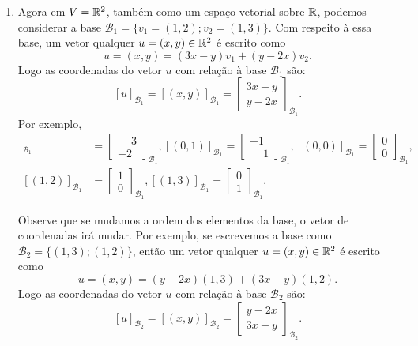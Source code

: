 \begin{exemplos}
\begin{enumerate}
    \item Agora em $V = \mathbb{R}^2$, também como um espaço vetorial sobre $\mathbb{R}$, podemos considerar a base $\mathcal{B}_1 = \{v_1 = (1, 2); v_2 = (1, 3)\}$. Com respeito à essa base, um vetor qualquer $u = (x, y) \in \mathbb{R}^2$ é escrito como
      \[
            u = (x, y) = (3x - y)v_1 + (y - 2x)v_2.
      \]
      Logo as coordenadas do vetor $u$ com relação à base $\mathcal{B}_1$ são:
      \[
        [u]_{\mathcal{B}_1} = [(x, y)]_{\mathcal{B}_1} = \begin{bmatrix}3x - y\\y - 2x\end{bmatrix}_{\mathcal{B}_1}.
      \]
      Por exemplo,
      \begin{align*}
        [(1, 0)]_{\mathcal{B}_1} &= \begin{bmatrix}\phantom{-}3\\-2\end{bmatrix}_{\mathcal{B}_1},
        [(0, 1)]_{\mathcal{B}_1} = \begin{bmatrix}-1\\\phantom{-}1\end{bmatrix}_{\mathcal{B}_1},
        [(0, 0)]_{\mathcal{B}_1} = \begin{bmatrix}0\\0\end{bmatrix}_{\mathcal{B}_1},\\
        [(1, 2)]_{\mathcal{B}_1} &= \begin{bmatrix}1\\0\end{bmatrix}_{\mathcal{B}_1},
        [(1, 3)]_{\mathcal{B}_1} = \begin{bmatrix}0\\1\end{bmatrix}_{\mathcal{B}_1}.
      \end{align*}

      Observe que se mudamos a ordem dos elementos da base, o vetor de coordenadas irá mudar. Por exemplo, se escrevemos a base como $\mathcal{B}_2 = \{(1, 3); (1, 2)\}$, então um vetor qualquer $u = (x, y) \in \mathbb{R}^2$ é escrito como
      \[
            u = (x, y) = (y - 2x)(1, 3) + (3x - y)(1, 2).
      \]
      Logo as coordenadas do vetor $u$ com relação à base $\mathcal{B}_2$ são:
      \[
        [u]_{\mathcal{B}_2} = [(x, y)]_{\mathcal{B}_2} = \begin{bmatrix}y - 2x\\3x - y\end{bmatrix}_{\mathcal{B}_2}.
      \]


\end{enumerate}
\end{exemplos}
